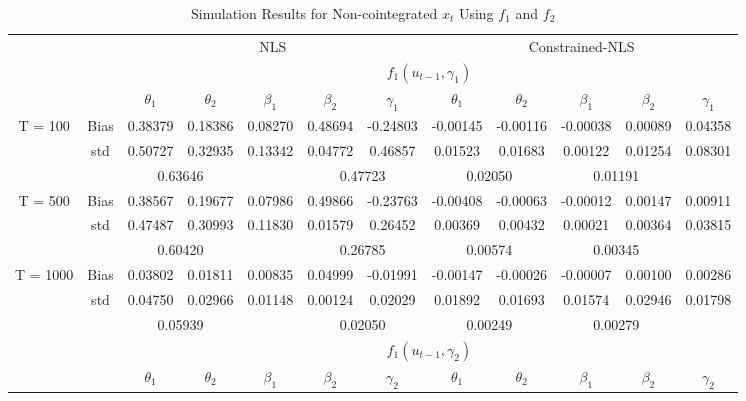 \documentclass[a4paper,12pt,times,numbered,print,index]{report}
\numberwithin{equation}{section}
\begin{document}
\begin{table}[htbp]
	\centering
	\caption{Simulation Results for Non-cointegrated $x_t$ Using $f_1$ and $f_2$}
	\begin{adjustbox}{max width=\textwidth}
		\begin{tabular}{cccccccccccc}
		\toprule
		&       & \multicolumn{5}{c}{NLS}               & \multicolumn{5}{c}{Constrained-NLS} \\
		&       & \multicolumn{10}{c}{$f_1 (u_{t-1}, \gamma_1)$}                \\
		&       & $\theta_1$ & $\theta_2$ & $\beta_1$ & $\beta_2$ & $\gamma_1$ & $\theta_1$ & $\theta_2$ & $\beta_1$ & $\beta_2$ & $\gamma_1$ \\
		\midrule
		\multirow{3}[1]{*}{T = 100} & Bias  & 0.38379 & 0.18386 & 0.08270 & 0.48694 & -0.24803 & -0.00145 & -0.00116 & -0.00038 & 0.00089 & 0.04358 \\
		& std   & 0.50727 & 0.32935 & 0.13342 & 0.04772 & 0.46857 & 0.01523 & 0.01683 & 0.00122 & 0.01254 & 0.08301 \\
		&       & \multicolumn{2}{c}{0.63646} &       & \multicolumn{2}{c}{0.47723} & \multicolumn{2}{c}{0.02050} & \multicolumn{2}{c}{0.01191} &  \\
		\multirow{3}[0]{*}{T = 500} & Bias  & 0.38567 & 0.19677 & 0.07986 & 0.49866 & -0.23763 & -0.00408 & -0.00063 & -0.00012 & 0.00147 & 0.00911 \\
		& std   & 0.47487 & 0.30993 & 0.11830 & 0.01579 & 0.26452 & 0.00369 & 0.00432 & 0.00021 & 0.00364 & 0.03815 \\
		&       & \multicolumn{2}{c}{0.60420} &       & \multicolumn{2}{c}{0.26785} & \multicolumn{2}{c}{0.00574} & \multicolumn{2}{c}{0.00345} &  \\
		\multirow{3}[1]{*}{T = 1000} & Bias  & 0.03802 & 0.01811 & \textcolor[rgb]{ 0,  .439,  .753}{0.00835} & 0.04999 & -0.01991 & -0.00147 & -0.00026 & \textcolor[rgb]{ 0,  .439,  .753}{-0.00007} & 0.00100 & 0.00286 \\
		& std   & 0.04750 & 0.02966 & \textcolor[rgb]{ 0,  .439,  .753}{0.01148} & 0.00124 & 0.02029 & 0.01892 & 0.01693 & \textcolor[rgb]{ 0,  .439,  .753}{0.01574} & 0.02946 & 0.01798 \\
		&       & \multicolumn{2}{c}{0.05939} &       & \multicolumn{2}{c}{0.02050} & \multicolumn{2}{c}{0.00249} & \multicolumn{2}{c}{0.00279} &  \\
		\midrule
		&       & \multicolumn{10}{c}{$f_1 (u_{t-1}, \gamma_2)$} \\
		&       & $\theta_1$ & $\theta_2$ & $\beta_1$ & $\beta_2$ & $\gamma_2$ & $\theta_1$ & $\theta_2$ & $\beta_1$ & $\beta_2$ & $\gamma_2$ \\

\end{tabular}
\end{adjustbox}
\end{table}
\end{document}
